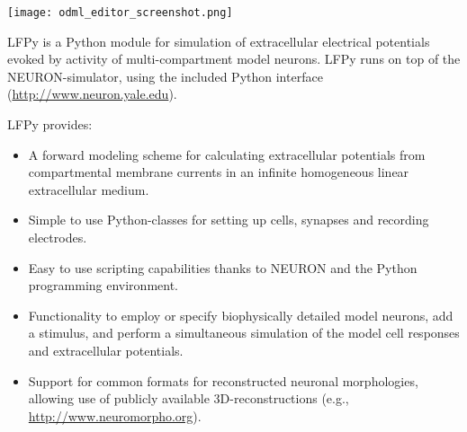 \begin{multicols}{3}
\vspace{0.5em}
\texttt{[image: odml\_editor\_screenshot.png]}





\vspace{0.5em}                  %
LFPy is a Python module for simulation of extracellular electrical
potentials evoked by activity of multi-compartment model neurons.
LFPy runs on top of the NEURON-simulator, using the included Python interface
(\url{http://www.neuron.yale.edu}).

LFPy provides:
\begin{itemize}[nolistsep, topsep=0em, leftmargin=1pc]
\item A forward modeling scheme for calculating extracellular potentials from compartmental membrane currents in an infinite homogeneous linear extracellular medium.
\item Simple to use Python-classes for setting up cells, synapses and recording electrodes.
\item Easy to use scripting capabilities thanks to NEURON and the Python programming environment.
\item Functionality to employ or specify biophysically detailed model neurons, add a stimulus, and perform a simultaneous simulation of the model cell responses and extracellular potentials.
\item Support for common formats for reconstructed neuronal morphologies, allowing use of publicly available 3D-reconstructions (e.g., \url{http://www.neuromorpho.org}). 
\end{itemize}



%



\end{multicols}
